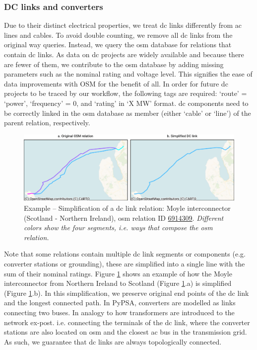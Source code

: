 \documentclass[fleqn,10pt]{wlscirep}
\let\autocite\cite
\begin{document}
\subsubsection*{DC links and converters}
Due to their distinct electrical properties, we treat \acrshort{dc} links differently from \acrshort{ac} lines and cables. To avoid double counting, we remove all \acrshort{dc} links from the original way queries. Instead, we query the \gls{osm} database for relations that contain \acrshort{dc} links. As data on \acrshort{dc} projects are widely available and because there are fewer of them,\autocite{entso-eENTSOETransmissionSystem,pierriChallengesOpportunitiesEuropean2017} we contribute to the \gls{osm} database by adding missing parameters such as the nominal rating and voltage level. This signifies the ease of data improvements with OSM for the benefit of all. In order for future \acrshort{dc} projects to be traced by our workflow, the following tags are required: `route' = `power', `frequency' = 0, and `rating' in `X MW' format. \acrshort{dc} components need to be correctly linked in the \acrshort{osm} database as member (either `cable' or `line') of the parent relation, respectively.

\begin{figure}[!htbp]
    \centering
    \includegraphics{figures/fig_dc_example.pdf}
    \caption{Example -- Simplification of a \acrshort{dc} link relation: Moyle interconnector (Scotland - Northern Ireland), \acrshort{osm} relation ID \href{https://www.openstreetmap.org/relation/6914309}{6914309}. \textit{Different colors show the four segments, i.e. ways that compose the \acrshort{osm} relation.}}
    \label{fig:dc_example}
\end{figure}

Note that some relations contain multiple \acrshort{dc} link segments or components (e.g. converter stations or grounding), these are simplified into a single line with the sum of their nominal ratings. Figure \ref{fig:dc_example} shows an example of how the Moyle interconnector from Northern Ireland to Scotland (Figure \ref{fig:dc_example}.a) is simplified (Figure \ref{fig:dc_example}.b). In this simplification, we preserve original end points of the \acrshort{dc} link and the longest connected path. In PyPSA, converters are modelled as links connecting two buses. In analogy to how transformers are introduced to the network ex-post. i.e. connecting the terminals of the \acrshort{dc} link, where the converter stations are also located on \acrshort{osm} and the closest \acrshort{ac} bus in the transmission grid. As such, we guarantee that \acrshort{dc} links are always topologically connected.
\end{document}

